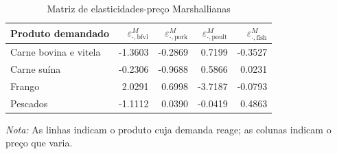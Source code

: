 
\begin{table}[H]
\centering
\caption{Matriz de elasticidades-preço Marshallianas}
\label{tab:elasticidades-marshallianas-dup}
\small
\begin{tabular}{@{}lrrrr@{}}
\toprule
Produto demandado & $\varepsilon^M_{\cdot,\text{bfvl}}$ & $\varepsilon^M_{\cdot,\text{pork}}$ & $\varepsilon^M_{\cdot,\text{poult}}$ & $\varepsilon^M_{\cdot,\text{fish}}$ \\
\midrule
Carne bovina e vitela & -1.3603 & -0.2869 & 0.7199 & -0.3527 \\
Carne suína & -0.2306 & -0.9688 & 0.5866 & 0.0231 \\
Frango & 2.0291 & 0.6998 & -3.7187 & -0.0793 \\
Pescados & -1.1112 & 0.0390 & -0.0419 & 0.4863 \\
\bottomrule
\end{tabular}
\par\vspace{0.35em}
\begin{minipage}{0.92\textwidth}\footnotesize \textit{Nota:} As linhas indicam o produto cuja demanda reage; as colunas indicam o preço que varia.\end{minipage}
\end{table}
